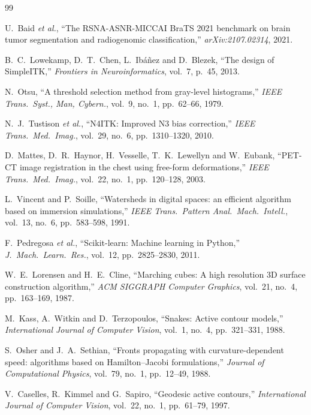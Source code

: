\documentclass[conference]{IEEEtran}
\begin{document}
\begin{thebibliography}{99}

U.~Baid \emph{et al.},
``The RSNA-ASNR-MICCAI BraTS 2021 benchmark on brain tumor
segmentation and radiogenomic classification,''
\emph{arXiv:2107.02314}, 2021.

B.~C.~Lowekamp, D.~T.~Chen, L.~Ibáñez and D.~Blezek,
``The design of SimpleITK,''
\emph{Frontiers in Neuroinformatics}, vol.~7, p.~45, 2013.

N.~Otsu,
``A threshold selection method from gray-level histograms,''
\emph{IEEE Trans.\ Syst., Man, Cybern.}, vol.~9, no.~1,
pp.~62--66, 1979.

N.~J.~Tustison \emph{et al.},
``N4ITK: Improved N3 bias correction,''
\emph{IEEE Trans.\ Med.\ Imag.}, vol.~29, no.~6,
pp.~1310--1320, 2010.

D.~Mattes, D.~R.~Haynor, H.~Vesselle, T.~K.~Lewellyn
and W.~Eubank,
``PET-CT image registration in the chest using free-form
deformations,''
\emph{IEEE Trans.\ Med.\ Imag.}, vol.~22, no.~1, pp.~120--128,
2003.

L.~Vincent and P.~Soille,
``Watersheds in digital spaces: an efficient algorithm based on
immersion simulations,''
\emph{IEEE Trans.\ Pattern Anal.\ Mach.\ Intell.}, vol.~13,
no.~6, pp.~583--598, 1991.

F.~Pedregosa \emph{et al.},
``Scikit-learn: Machine learning in Python,''
\emph{J.\ Mach.\ Learn.\ Res.}, vol.~12, pp.~2825--2830, 2011.

W.~E.~Lorensen and H.~E.~Cline,
``Marching cubes: A high resolution 3D surface construction
algorithm,''
\emph{ACM SIGGRAPH Computer Graphics}, vol.~21, no.~4,
pp.~163--169, 1987.

M.~Kass, A.~Witkin and D.~Terzopoulos,
``Snakes: Active contour models,''
\emph{International Journal of Computer Vision}, vol.~1, no.~4,
pp.~321--331, 1988.

S.~Osher and J.~A.~Sethian,
``Fronts propagating with curvature-dependent speed: algorithms
based on Hamilton--Jacobi formulations,''
\emph{Journal of Computational Physics}, vol.~79, no.~1,
pp.~12--49, 1988.

V.~Caselles, R.~Kimmel and G.~Sapiro,
``Geodesic active contours,''
\emph{International Journal of Computer Vision}, vol.~22, no.~1,
pp.~61--79, 1997.


\end{thebibliography}
\end{document}
